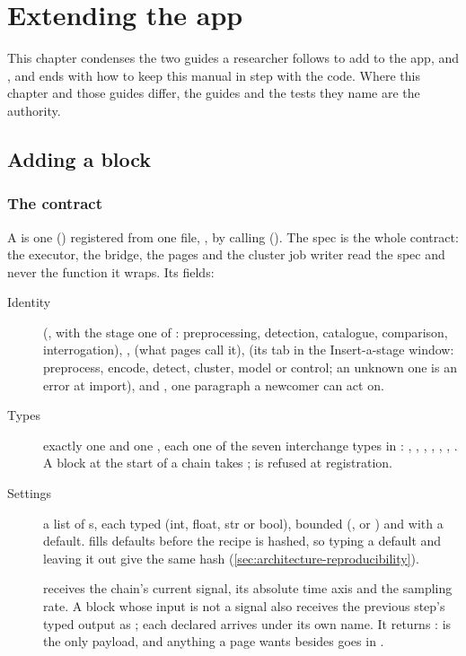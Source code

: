 \chapter{Extending the app}\label{ch:extending}
This chapter condenses the two guides a researcher follows to add to the app,
 and , and ends with how to keep
this manual in step with the code. Where this chapter and those guides differ, the guides and the
tests they name are the authority.

\section{Adding a block}\label{sec:extending-block}
\subsection{The contract}
A  is one  () registered from one file,
, by calling  (). The
spec is the whole contract: the executor, the bridge, the pages and the cluster job writer read the
spec and never the function it wraps. Its fields:

\begin{description}
\item[Identity]  (, with the stage one of
  : preprocessing, detection, catalogue, comparison, interrogation),
  ,  (what pages call it),  (its tab in the
  Insert-a-stage window: preprocess, encode, detect, cluster, model or control; an unknown one is an
  error at import), and , one paragraph a newcomer can act on.
\item[Types] exactly one  and one , each one of the seven
  interchange types in : , , ,
  , , , . A block at the start of a chain
  takes ;  is refused at registration.
\item[Settings] a list of s, each typed (int, float, str or bool), bounded
  (,  or ) and with a default.  fills
  defaults before the recipe is hashed, so typing a default and leaving it out give the same hash
  (\cref{sec:architecture-reproducibility}).
\item[]  receives the chain's current signal, its
  absolute time axis and the sampling rate. A block whose input is not a signal also receives the
  previous step's typed output as ; each declared  arrives
  under its own name. It returns :
   is the only payload, and anything a page wants besides goes in .
\end{description}

